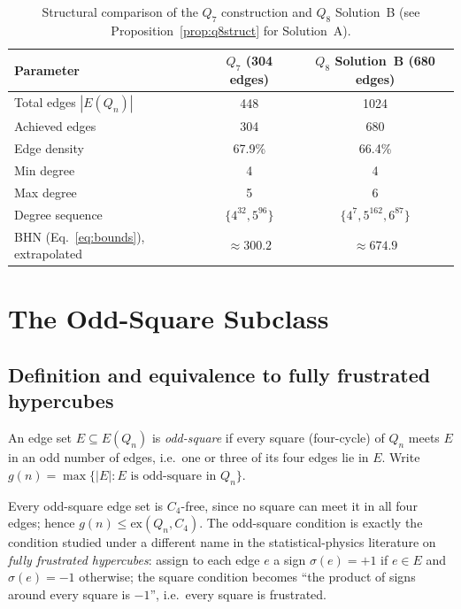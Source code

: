 \documentclass[12pt]{article}
\newcommand{\ex}{\mathrm{ex}}
\begin{document}
\begin{table}[ht]
\centering
\caption{Structural comparison of the $Q_7$ construction and $Q_8$
  Solution~B (see Proposition~\ref{prop:q8struct} for Solution~A).}
\label{tab:compare}\medskip
\begin{tabular}{lcc}
\toprule
Parameter & $Q_7$ (304 edges) & $Q_8$ Solution~B (680 edges)\\
\midrule
Total edges $|E(Q_n)|$ & 448 & 1024\\
Achieved edges & 304 & 680\\
Edge density & 67.9\% & 66.4\%\\
Min degree & 4 & 4\\
Max degree & 5 & 6\\
Degree sequence & $\{4^{32},5^{96}\}$ & $\{4^7,5^{162},6^{87}\}$\\
BHN (Eq.~\ref{eq:bounds}), extrapolated & $\approx300.2$ & $\approx674.9$\\
\bottomrule
\end{tabular}
\end{table}

\section{The Odd-Square Subclass}\label{sec:oddsquare}

\subsection{Definition and equivalence to fully frustrated hypercubes}

\begin{definition}
An edge set $E\subseteq E(Q_n)$ is \emph{odd-square} if every square
(four-cycle) of $Q_n$ meets $E$ in an odd number of edges, i.e.\ one or
three of its four edges lie in $E$. Write
$g(n)=\max\{|E|:E\text{ is odd-square in }Q_n\}$.
\end{definition}

Every odd-square edge set is $C_4$-free, since no square can meet it in all
four edges; hence $g(n)\le\ex(Q_n,C_4)$. The odd-square condition is exactly
the condition studied under a different name in the statistical-physics
literature on \emph{fully frustrated hypercubes}: assign to each edge $e$ a
sign $\sigma(e)=+1$ if $e\in E$ and $\sigma(e)=-1$ otherwise; the square
condition becomes ``the product of signs around every square is $-1$'', i.e.\
every square is frustrated.
\end{document}
